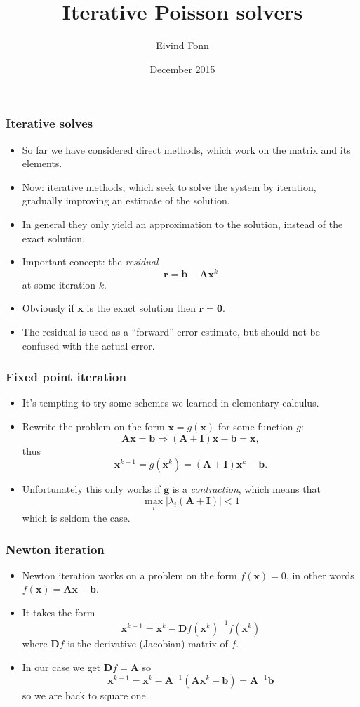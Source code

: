 

\title{Iterative Poisson solvers}
\author{Eivind Fonn}
\date{December 2015}
\maketitle

\begin{frame}
  \frametitle{Iterative solves}
  \begin{itemize}
  \item So far we have considered direct methods, which work on the matrix and
    its elements.
  \item Now: iterative methods, which seek to solve the system by iteration,
    gradually improving an estimate of the solution.
  \item In general they only yield an approximation to the solution, instead of
    the exact solution.
  \item Important concept: the \emph{residual}
    \[
      \bm r = \bm b - \bm A \bm x^k
    \]
    at some iteration $k$.
  \item Obviously if $\bm x$ is the exact solution then $\bm r = \bm 0$.
  \item The residual is used as a ``forward'' error estimate, but should not be
    confused with the actual error.
  \end{itemize}
\end{frame}

\begin{frame}
  \frametitle{Fixed point iteration}
  \begin{itemize}
  \item It's tempting to try some schemes we learned in elementary calculus.
  \item Rewrite the problem on the form $\bm x =g(\bm x)$ for some function $g$:
    \[
      \bm A \bm x = \bm b \Rightarrow (\bm A + \bm I) \bm x - \bm b = \bm x,
    \]
    thus
    \[
      \bm x^{k+1} = g(\bm x^k) = (\bm A + \bm I) \bm x^k - \bm b.
    \]
  \item Unfortunately this only works if $\bm g$ is a \emph{contraction}, which
    means that
    \[
      \max_i |\lambda_i(\bm A + \bm I)| < 1
    \]
    which is seldom the case.
  \end{itemize}
\end{frame}

\begin{frame}
  \frametitle{Newton iteration}
  \begin{itemize}
  \item Newton iteration works on a problem on the form $f(\bm x) = 0$, in other
    words $f(\bm x) = \bm A \bm x - \bm b$.
  \item It takes the form
    \[
      \bm x^{k+1} = \bm x^k - \bm Df(\bm x^k)^{-1} f(\bm x^k)
    \]
    where $\bm Df$ is the derivative (Jacobian) matrix of $f$.
  \item In our case we get $\bm Df = \bm A$ so
    \[
      \bm x^{k+1} = \bm x^k - \bm A^{-1}(\bm A \bm x^{k} - \bm b) = \bm A^{-1} \bm b
    \]
    so we are back to square one.
  \end{itemize}
\end{frame}

